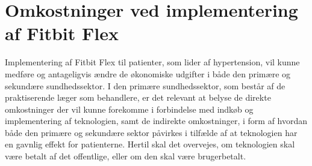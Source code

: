 
\section{Omkostninger ved implementering af Fitbit Flex}


Implementering af Fitbit Flex til patienter, som lider af hypertension, vil kunne medføre og antageligvis ændre de økonomiske udgifter i både den primære og sekundære sundhedssektor. I den primære sundhedssektor, som består af de praktiserende læger som behandlere, er det relevant at belyse de direkte omkostninger der vil kunne forekomme i forbindelse med indkøb og implementering af teknologien, samt de indirekte omkostninger, i form af hvordan både den primære og sekundære sektor påvirkes i tilfælde af at teknologien har en gavnlig effekt for patienterne. Hertil skal det overvejes, om teknologien skal være betalt af det offentlige, eller om den skal være brugerbetalt. 

